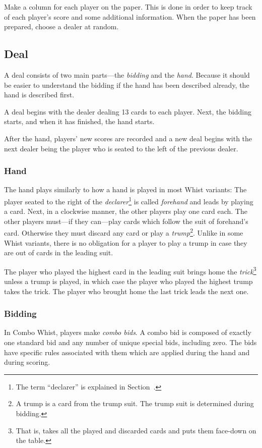\documentclass[a4paper]{article} %
\begin{document}
	Make a column for each player on the paper. This is done in order to keep track of each player's score and some additional information. When the paper has been prepared, choose a dealer at random.

	\subsection{Deal}
	A deal consists of two main parts---the \emph{bidding} and the \emph{hand}. Because it should be easier to understand the bidding if the hand has been described already, the hand is described first.

	A deal begins with the dealer dealing 13 cards to each player. Next, the bidding starts, and when it has finished, the hand starts.

	After the hand, players' new scores are recorded and a new deal begins with the next dealer being the player who is seated to the left of the previous dealer.

	\subsubsection{Hand}
	The hand plays similarly to how a hand is played in most Whist variants: The player seated to the right of the \emph{declarer}\footnote{The term ``declarer'' is explained in Section~.} is called \emph{forehand} and leads by playing a card. Next, in a clockwise manner, the other players play one card each. The other players must---if they can---play cards which follow the suit of forehand's card. Otherwise they must discard any card or play a \emph{trump}\footnote{A trump is a card from the trump suit. The trump suit is determined during bidding.}. Unlike in some Whist variants, there is no obligation for a player to play a trump in case they are out of cards in the leading suit.

	The player who played the highest card in the leading suit brings home the \emph{trick}\footnote{That is, takes all the played and discarded cards and puts them face-down on the table.} unless a trump is played, in which case the player who played the highest trump takes the trick. The player who brought home the last trick leads the next one.

	\subsubsection{Bidding}
	\label{sec:bidding}
	In Combo Whist, players make \emph{combo bids}. A combo bid is composed of exactly one standard bid and any number of unique special bids, including zero. The bids have specific rules associated with them which are applied during the hand and during scoring.
\end{document}
